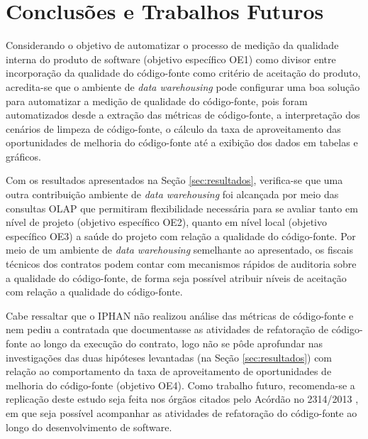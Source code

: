 \section{Conclusões e Trabalhos Futuros}

Considerando o objetivo de automatizar o processo de medição da qualidade interna do produto de software (objetivo específico OE1) como divisor entre incorporação da qualidade do código-fonte como critério de aceitação do produto, acredita-se que o ambiente de \textit{data warehousing} pode configurar uma boa solução para automatizar a medição de qualidade do código-fonte, pois foram automatizados desde a extração das métricas de código-fonte, a interpretação dos cenários de limpeza de código-fonte, o cálculo da taxa de aproveitamento das oportunidades de melhoria do código-fonte até a exibição dos dados em tabelas e gráficos.

Com os resultados apresentados na Seção \ref{sec:resultados}, verifica-se que uma outra contribuição ambiente de \textit{data warehousing} foi alcançada por meio das consultas OLAP que permitiram flexibilidade necessária para se avaliar tanto em nível de projeto (objetivo específico OE2), quanto em nível local (objetivo específico OE3) a saúde do projeto com relação a qualidade do código-fonte. Por meio de um ambiente de \textit{data warehousing} semelhante ao apresentado, os fiscais técnicos dos contratos podem contar com mecanismos rápidos de auditoria sobre a qualidade do código-fonte, de forma seja possível atribuir níveis de aceitação com relação a qualidade do código-fonte. 

Cabe ressaltar que o IPHAN não realizou análise das métricas de código-fonte e nem pediu a contratada que documentasse as atividades de refatoração de código-fonte ao longo da execução do contrato, logo não se pôde aprofundar nas investigações das duas hipóteses levantadas (na Seção \ref{sec:resultados}) com relação ao comportamento da taxa de aproveitamento de oportunidades de melhoria do código-fonte (objetivo OE4). Como trabalho futuro, recomenda-se a replicação deste estudo seja feita nos órgãos citados pelo Acórdão no 2314/2013 \cite{TCU:2013}, em que seja possível acompanhar as atividades de refatoração do código-fonte ao longo do desenvolvimento de software.
